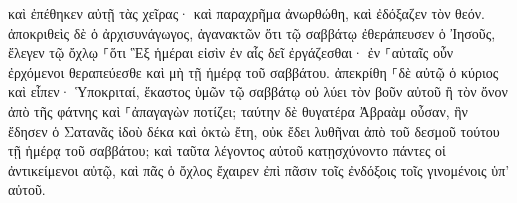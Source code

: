 \documentclass{openreader}
\begin{document}
καὶ ἐπέθηκεν αὐτῇ τὰς χεῖρας· καὶ παραχρῆμα ἀνωρθώθη, καὶ ἐδόξαζεν τὸν θεόν. 
ἀποκριθεὶς δὲ ὁ ἀρχισυνάγωγος, ἀγανακτῶν ὅτι τῷ σαββάτῳ ἐθεράπευσεν ὁ Ἰησοῦς, ἔλεγεν τῷ ὄχλῳ ⸀ὅτι Ἓξ ἡμέραι εἰσὶν ἐν αἷς δεῖ ἐργάζεσθαι· ἐν ⸀αὐταῖς οὖν ἐρχόμενοι θεραπεύεσθε καὶ μὴ τῇ ἡμέρᾳ τοῦ σαββάτου. 
ἀπεκρίθη ⸀δὲ αὐτῷ ὁ κύριος καὶ εἶπεν· Ὑποκριταί, ἕκαστος ὑμῶν τῷ σαββάτῳ οὐ λύει τὸν βοῦν αὐτοῦ ἢ τὸν ὄνον ἀπὸ τῆς φάτνης καὶ ⸀ἀπαγαγὼν ποτίζει; 
ταύτην δὲ θυγατέρα Ἀβραὰμ οὖσαν, ἣν ἔδησεν ὁ Σατανᾶς ἰδοὺ δέκα καὶ ὀκτὼ ἔτη, οὐκ ἔδει λυθῆναι ἀπὸ τοῦ δεσμοῦ τούτου τῇ ἡμέρᾳ τοῦ σαββάτου; 
καὶ ταῦτα λέγοντος αὐτοῦ κατῃσχύνοντο πάντες οἱ ἀντικείμενοι αὐτῷ, καὶ πᾶς ὁ ὄχλος ἔχαιρεν ἐπὶ πᾶσιν τοῖς ἐνδόξοις τοῖς γινομένοις ὑπ’ αὐτοῦ. 
\end{document}
